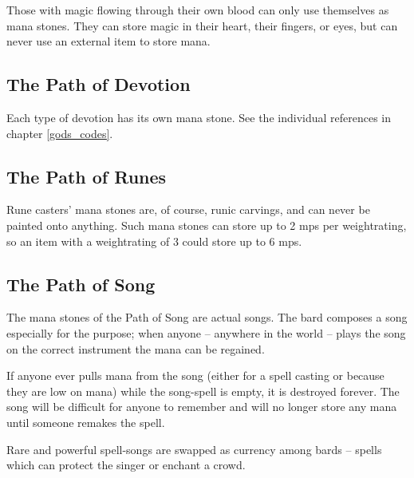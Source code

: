 \begin{multicols}{2}
\begin{multicols}{2}

Those with magic flowing through their own blood can only use themselves as mana stones.
They can store magic in their heart, their fingers, or eyes, but can never use an external item to store mana.

\subsection{The Path of Devotion}


Each type of devotion has its own mana stone.
See the individual references in chapter \ref{gods_codes}.

\subsection{The Path of Runes}


Rune casters' mana stones are, of course, runic carvings, and can never be painted onto anything.
Such mana stones can store up to 2 \glspl{mp} per \gls{weightrating}, so an item with a \gls{weightrating} of 3 could store up to 6 \glspl{mp}.

\subsection{The Path of Song}
\label{song}

The mana stones of the Path of Song are actual songs.
The bard composes a song especially for the purpose; when anyone -- anywhere in the world -- plays the song on the correct instrument the mana can be regained.

If anyone ever pulls mana from the song (either for a spell casting or because they are low on mana) while the song-spell is empty, it is destroyed forever.
The song will be difficult for anyone to remember and will no longer store any mana until someone remakes the spell.

Rare and powerful spell-songs are swapped as currency among bards -- spells which can protect the singer or enchant a crowd.


\end{multicols}

\end{multicols}

